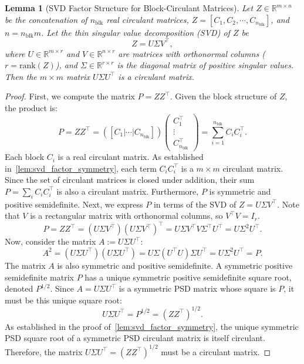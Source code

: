 \documentclass[11pt]{article}
\newtheorem{lemma}{Lemma}
\begin{document}
\begin{lemma}[SVD Factor Structure for Block-Circulant Matrices]
\label{lem:svd_factor_symmetry_block}
Let \(Z \in \mathbb{R}^{m \times n}\) be the concatenation of \(n_{\mathrm{blk}}\) real circulant matrices, \(Z = [C_{1}, C_{2}, \cdots, C_{n_{\mathrm{blk}}}]\), and \(n=n_{\mathrm{blk}}m\). Let the thin singular value decomposition (SVD) of \(Z\) be
\[ Z = U\Sigma V^\top, \]
where \(U \in \mathbb{R}^{m \times r}\) and \(V \in \mathbb{R}^{n \times r}\) are matrices with orthonormal columns (\(r = \mathrm{rank}(Z)\)), and \(\Sigma \in \mathbb{R}^{r \times r}\) is the diagonal matrix of positive singular values.
Then the \(m \times m\) matrix \(U\Sigma U^\top\) is a circulant matrix.
\end{lemma}

\begin{proof}
First, we compute the matrix \(P = ZZ^\top\). Given the block structure of \(Z\), the product is:
\[
P = ZZ^\top = \left( [C_1 | \cdots | C_{n_{\mathrm{blk}}}] \right) \begin{pmatrix} C_1^\top \\ \vdots \\ C_{n_{\mathrm{blk}}}^\top \end{pmatrix} = \sum_{i=1}^{n_{\mathrm{blk}}} C_i C_i^\top.
\]
Each block \(C_i\) is a real circulant matrix. As established in~\cref{lem:svd_factor_symmetry}, each term \(C_i C_i^\top\) is a \(m \times m\) circulant matrix. Since the set of circulant matrices is closed under addition, their sum \(P = \sum_i C_i C_i^\top\) is also a circulant matrix.
Furthermore, \(P\) is symmetric and positive semidefinite.
Next, we express \(P\) in terms of the SVD of \(Z = U\Sigma V^\top\). Note that \(V\) is a rectangular matrix with orthonormal columns, so \(V^\top V = I_r\).
\[
P = ZZ^\top = (U\Sigma V^\top)(U\Sigma V^\top)^\top = U\Sigma V^\top V \Sigma^\top U^\top = U\Sigma^2 U^\top.
\]
Now, consider the matrix \(A := U\Sigma U^\top\):
\[ A^2 = (U\Sigma U^\top)(U\Sigma U^\top) = U\Sigma(U^\top U)\Sigma U^\top = U\Sigma^2 U^\top = P. \]
The matrix \(A\) is also symmetric and positive semidefinite.
A symmetric positive semidefinite matrix \(P\) has a unique symmetric positive semidefinite square root, denoted \(P^{1/2}\). Since \(A = U\Sigma U^\top\) is a symmetric PSD matrix whose square is \(P\), it must be this unique square root:
\[ U\Sigma U^\top = P^{1/2} = (ZZ^\top)^{1/2}. \]
As established in the proof of~\cref{lem:svd_factor_symmetry}, the unique symmetric PSD square root of a symmetric PSD circulant matrix is itself circulant.
Therefore, the matrix \(U\Sigma U^\top = (ZZ^\top)^{1/2}\) must be a circulant matrix.
\end{proof}
\end{document}
